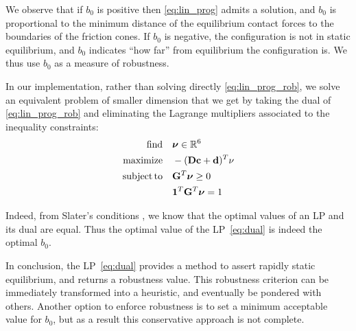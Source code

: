 We observe that if $b_0$ is positive then \eqref{eq:lin_prog} admits a solution, and $b_0$ is proportional to the minimum distance of the equilibrium contact forces to the boundaries of the friction cones.
If $b_0$ is negative, the configuration is not in static equilibrium, and $b_0$ indicates ``how far'' from equilibrium the configuration is. We thus use $b_0$ as a measure of robustness.

In our implementation, rather than solving directly \eqref{eq:lin_prog_rob}, we solve an equivalent problem of smaller dimension that we get by taking the dual of \eqref{eq:lin_prog_rob} and eliminating the Lagrange multipliers associated to the inequality constraints:
\begin{equation} \label{eq:dual} \begin{aligned}
\find \quad & \bm{\nu} \in \Rv{6}\\
\maximize  \quad & -(\mathbf{D} \mathbf{c} + \mathbf{d})^T \nu \\
\st \quad &\mathbf{G}^T \bm{\nu} \ge 0 \\
& \mathbf{1}^T \mathbf{G}^T \bm{\nu} = 1 \\
\end{aligned} \end{equation}

Indeed, from Slater's conditions \citep{Boyd:2004:CO:993483}, we know that the optimal values of an LP and its dual are equal. Thus the optimal value of the LP~\eqref{eq:dual} is indeed the optimal $b_0$.

In conclusion, the LP~\eqref{eq:dual} provides a method to assert rapidly static equilibrium, and returns a robustness value.
This robustness criterion can be immediately transformed into a heuristic, and eventually be pondered with others.
Another option to enforce robustness is to set a minimum acceptable value for $b_0$, but as a result this conservative approach is not complete.
